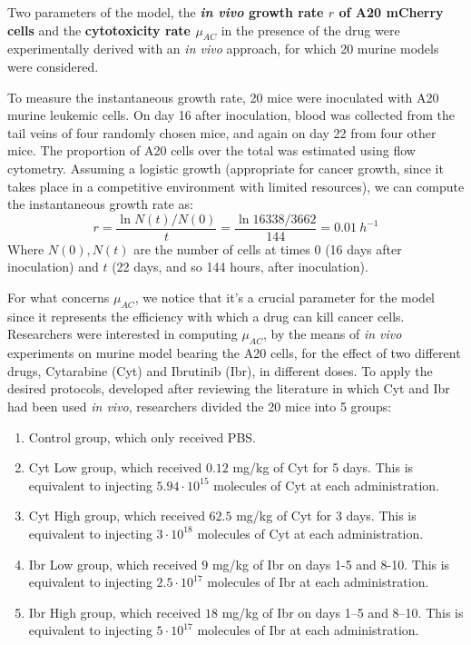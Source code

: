 Two parameters of the model, the \textbf{\textit{in vivo} growth rate $r$ of A20 mCherry cells} and the \textbf{cytotoxicity rate $\mu_{AC}$} in the presence of the drug were experimentally derived with an \textit{in vivo} approach, for which 20 murine models were considered. \par
\vspace{0.4cm}
To measure the instantaneous growth rate, 20 mice were inoculated with A20 murine leukemic cells. On day 16 after inoculation, blood was collected from the tail veins of four randomly chosen mice, and again on day 22 from four other mice. The proportion of A20 cells over the total was estimated using flow cytometry. Assuming a logistic growth (appropriate for cancer growth, since it takes place in a competitive environment with limited resources), we can compute the instantaneous growth rate as: 
\[ r = \frac{\ln{N(t)/N(0)}}{t} = \frac{\ln{16338/3662}}{144} = 0.01\ h^{-1} \]
Where $N(0), N(t)$ are the number of cells at times $0$ (16 days after inoculation) and $t$ (22 days, and so 144 hours, after inoculation).\\ \par
\vspace{0.4cm}
For what concerns $\mu_{AC}$, we notice that it's a crucial parameter for the model since it represents the efficiency with which a drug can kill cancer cells. Researchers were interested in computing $\mu_{AC}$, by the means of \textit{in vivo} experiments on murine model bearing the A20 cells, for the effect of two different drugs, Cytarabine (Cyt) and Ibrutinib (Ibr), in different doses. To apply the desired protocols, developed after reviewing the literature in which Cyt and Ibr had been used \textit{in vivo}, researchers divided the 20 mice into 5 groups:\begin{enumerate}
	\item Control group, which only received PBS.
	\item Cyt Low group, which received $0.12$ mg/kg of Cyt for 5 days. This is equivalent to injecting $5.94 \cdot 10^{15}$ molecules of Cyt at each
	administration. 
	\item Cyt High group, which received $62.5$ mg/kg of Cyt for 3 days. This is equivalent to injecting $3 \cdot 10^{18}$ molecules of Cyt at each
	administration. 
	\item Ibr Low group, which received $9$ mg/kg of Ibr on days 1-5 and 8-10. This is equivalent to injecting $2.5 \cdot 10^{17}$ molecules of Ibr at 
	each administration. 
	\item Ibr High group, which received $18$ mg/kg of Ibr on days 1–5 and 8–10. This is equivalent to injecting $5 \cdot 10^{17}$ molecules of Ibr at 
	each administration. 
\end{enumerate}
